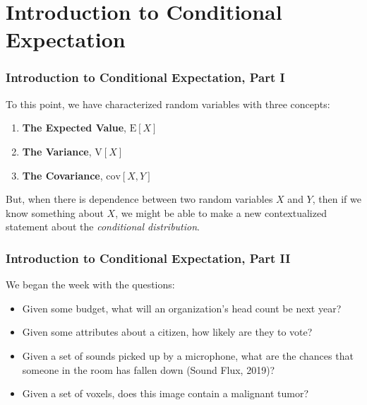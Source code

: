 \documentclass[12pt, block=fill]{beamer}
\newcommand{\E}{\text{E}}
\newcommand{\V}{\text{V}}
\newcommand{\cov}{\text{cov}}
\begin{document}
\section{Introduction to Conditional Expectation}

\begin{frame}
  \frametitle{Introduction to Conditional Expectation, Part I}
  To this point, we have characterized random variables with three
  concepts:
  \begin{enumerate}
  \item \textbf{The Expected Value}, $\E[X]$
  \item \textbf{The Variance}, $\V[X]$
  \item\textbf{The Covariance}, $\cov[X,Y]$
  \end{enumerate}
  But, when there is dependence between two random variables $X$ and
  $Y$, then if we know something about $X$, we might be able to make a
  new contextualized statement about the \textit{conditional
    distribution}. \\
    
\end{frame}

\begin{frame}
  \frametitle{Introduction to Conditional Expectation, Part II}
  We began the week with the questions:
  \begin{itemize}
  \item Given some budget, what will an organization's head count be
    next year?
  \item Given some attributes about a citizen, how likely are they to
    vote?
  \item Given a set of sounds picked up by a microphone, what are the
    chances that someone in the room has fallen down (Sound Flux,
    2019)?
  \item Given a set of voxels, does this image contain a malignant
    tumor?
  \end{itemize}
\end{frame}
\end{document}
